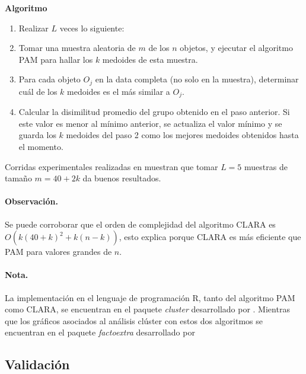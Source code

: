 \documentclass[12pt,oneside]{book}\usepackage[]{graphicx}\usepackage[]{color}
\theoremstyle{definition} %
\begin{document}
\textbf{Algoritmo}

\begin{enumerate}
\item Realizar $L$ veces lo siguiente:
\item Tomar una muestra aleatoria de $m$ de los $n$ objetos, y ejecutar el algoritmo PAM para hallar los $k$ medoides de esta muestra.
\item Para cada objeto $O_j$ en la data completa (no solo en la muestra), determinar cuál de los $k$ medoides es el más similar a $O_j$.
\item Calcular la disimilitud promedio del grupo obtenido en el paso anterior. Si este valor es menor al mínimo anterior, se actualiza el valor mínimo y se guarda los $k$ medoides del paso 2 como los mejores medoides obtenidos hasta el momento.

\end{enumerate}

Corridas experimentales realizadas en \citeauthor{rousseeuw1990finding} \citeyear{rousseeuw1990finding} muestran que tomar $L=5$ muestras de tamaño $m=40 + 2k$ da buenos resultados. 

\paragraph{Observación. } Se puede corroborar que el orden de complejidad del algoritmo CLARA es $O(k(40+k)^2+k(n-k))$, esto explica porque CLARA es más eficiente que PAM para valores grandes de $n$.

\paragraph{Nota.}

La implementación en el lenguaje de programación R, tanto del algoritmo PAM como CLARA, se encuentran en el paquete \textit{cluster} desarrollado por \citeauthor{clust2019r} \citeyear{clust2019r}. Mientras que los gráficos asociados al análisis clúster con estos dos algoritmos se encuentran en el paquete \textit{factoextra} desarrollado por \citeauthor{factoext2017r} \citeyear{factoext2017r}


\subsection{Validación}
\end{document}
